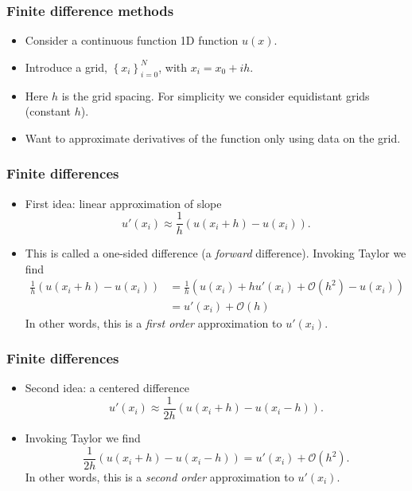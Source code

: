 \begin{frame}
  \frametitle{Finite difference methods}
  \begin{itemize}
    \item Consider a continuous function 1D function $u(x)$.
    \item Introduce a grid, $\left\{x_i\right\}_{i=0}^N$, with $x_i = x_0+ih$.
    \item Here $h$ is the grid spacing. For simplicity we consider equidistant
      grids (constant $h$).
      \begin{center}
        \scalebox{0.7}{}
      \end{center}
    \item Want to approximate derivatives of the function only using data on the grid.
  \end{itemize}
\end{frame}

\begin{frame}
  \frametitle{Finite differences}
  \begin{itemize}
  \item First idea:  linear approximation of slope
    \[
      u'(x_i) \approx \frac{1}{h} \left( u(x_i+h)-u(x_i) \right).
    \]
  \item This is called a one-sided difference (a \emph{forward} difference).
    Invoking Taylor we find
    \begin{align*}
      \frac{1}{h} \left( u(x_i+h)-u(x_i) \right)
      &= \frac{1}{h} \left( u(x_i) + hu'(x_i) + \mathcal{O}(h^2) - u(x_i) \right) \\
      &= u'(x_i) + \mathcal{O}(h)
    \end{align*}
    In other words, this is a \emph{first order} approximation to $u'(x_i)$.
  \end{itemize}
\end{frame}

\begin{frame}
  \frametitle{Finite differences}
  \begin{itemize}
  \item Second idea: a centered difference
    \[
      u'(x_i) \approx \frac{1}{2h} \left( u(x_i + h) - u(x_i - h) \right).
    \]
  \item Invoking Taylor we find
    \[
      \frac{1}{2h} \left( u(x_i + h) - u(x_i - h) \right)
      = u'(x_i) + \mathcal{O}(h^2).
    \]
    In other words, this is a \emph{second order} approximation to $u'(x_i)$.
  \end{itemize}
\end{frame}

